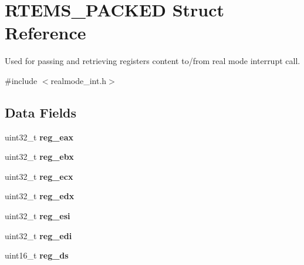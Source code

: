 \hypertarget{structRTEMS__PACKED}{}\section{R\+T\+E\+M\+S\+\_\+\+P\+A\+C\+K\+ED Struct Reference}
\label{structRTEMS__PACKED}


Used for passing and retrieving registers content to/from real mode interrupt call.  




{\ttfamily \#include $<$realmode\+\_\+int.\+h$>$}

\subsection*{Data Fields}
\begin{DoxyCompactItemize}
\item 
\mbox{\label{structRTEMS__PACKED_a9878e789c2b513f0c7b7158a1918b370}} 
uint32\+\_\+t {\bfseries reg\+\_\+eax}
\item 
\mbox{\label{structRTEMS__PACKED_a87c4a4186d429ec4ca16ae838a2c18b5}} 
uint32\+\_\+t {\bfseries reg\+\_\+ebx}
\item 
\mbox{\label{structRTEMS__PACKED_a7c667981d77caf3b7dafc7273b29fa97}} 
uint32\+\_\+t {\bfseries reg\+\_\+ecx}
\item 
\mbox{\label{structRTEMS__PACKED_a9bc134e40ac11716075e6aabef6f9a63}} 
uint32\+\_\+t {\bfseries reg\+\_\+edx}
\item 
\mbox{\label{structRTEMS__PACKED_a9301ade8059489d39b9871d0c3f2e655}} 
uint32\+\_\+t {\bfseries reg\+\_\+esi}
\item 
\mbox{\label{structRTEMS__PACKED_ab49a6992a29ff445850f5743d6dce397}} 
uint32\+\_\+t {\bfseries reg\+\_\+edi}
\item 
\mbox{\label{structRTEMS__PACKED_a0f27c172fc5191bdff9e5f7aafe87824}} 
uint16\+\_\+t {\bfseries reg\+\_\+ds}
\item 
\mbox{\label{structRTEMS__PACKED_ad563bbedea8980de17a6a7eb099b8d34}} 

\end{DoxyCompactItemize}
